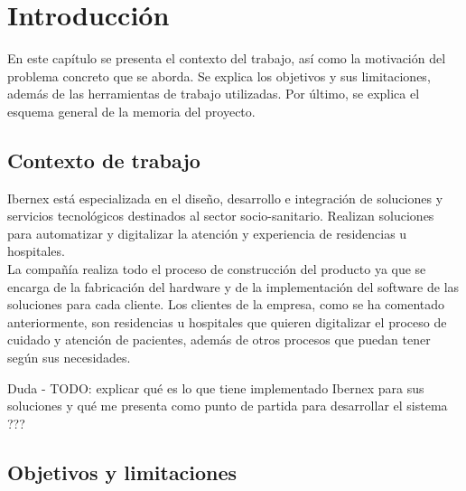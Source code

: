 \chapter{Introducción}
\label{ch:no_lineal}

En este capítulo se presenta el contexto del trabajo, así como la motivación del problema concreto que se aborda. Se explica los objetivos y sus limitaciones, además de las herramientas de trabajo utilizadas. Por último, se explica el esquema general de la memoria del proyecto.

\section{Contexto de trabajo}


 Ibernex está especializada en el diseño, desarrollo e integración de soluciones y servicios tecnológicos destinados al sector socio-sanitario.
 Realizan soluciones para automatizar y digitalizar la atención y experiencia de residencias u hospitales. \\


 La compañía realiza todo el proceso de construcción del producto ya que se encarga de la fabricación del hardware y de la implementación del software de las soluciones para cada cliente.
 Los clientes de la empresa, como se ha comentado anteriormente, son residencias u hospitales que quieren digitalizar el proceso de cuidado y atención de pacientes, además de otros procesos que puedan tener según sus necesidades. \newline


Duda - TODO: explicar qué es lo que tiene implementado Ibernex para sus soluciones y qué me presenta como punto de partida para desarrollar el sistema ???





\section{Objetivos y limitaciones}

